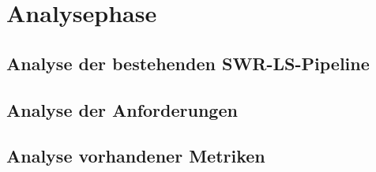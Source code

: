 \chapter{Analysephase}\label{ch:analysephase}


\section{Analyse der bestehenden SWR-LS-Pipeline}


\section{Analyse der Anforderungen}


\section{Analyse vorhandener Metriken}\label{ch:metrikenanalyse}
